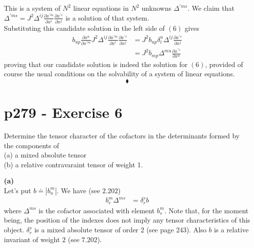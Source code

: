 This is a system of $N^2$ linear equations in $N^2$ unknowns $\Delta^{'ms}$.  We claim that  $\Delta^{'ms}= J^2 \Delta^{ij}\frac{\partial x^{'m} }{\partial {x^{i}}}\frac{\partial x^{'s} }{\partial x^{j}}$ is a solution of that system.\\
Substituting this candidate solution in the left side of $(6)$ gives
\begin{align}
b^{}_{up}\frac{\partial x^{u} }{\partial x^{'m}}J^2 \Delta^{ij}\frac{\partial x^{'m} }{\partial {x^{i}}}\frac{\partial x^{'s} }{\partial x^{j}}&=J^2b^{}_{up}\delta^u_i\Delta^{ij}\frac{\partial x^{'s} }{\partial x^{j}}\\
&=J^2b_{mp}\Delta^{mu}\frac{\partial x^{'s} }{\partial {x^u}}  
\end{align}
proving that our candidate solution is indeed the solution for $(6)$, provided of course the usual conditions on the solvability of a system of linear equations.
$$\blacklozenge$$
\newpage


\section{p279 - Exercise 6}
\begin{tcolorbox}
Determine the tensor character of the cofactors in the determinants formed by the components of \\
(a) a mixed absolute tensor\\
(b) a relative contravaraint tensor of weight 1.
\end{tcolorbox}
\textbf{(a)\\}
Let's put $b \doteq \left|b^m_{n}\right|$. We have (see $\mathbf{2.202}$)
\begin{align}
b^{m}_{r}\Delta^{ms}&=\delta^s_r b
\end{align}
where $\Delta^{ms}$ is the cofactor associated with element $b^m_{s}$. Note that, for the moment being, the position of the indexes does not imply any tensor characteristics of this object.
$\delta^s_r$ is a mixed absolute tensor of order 2 (see page 243).
Also $b$ is a relative invariant of weight $2$ (see $\mathbf{7.202}$).\\

